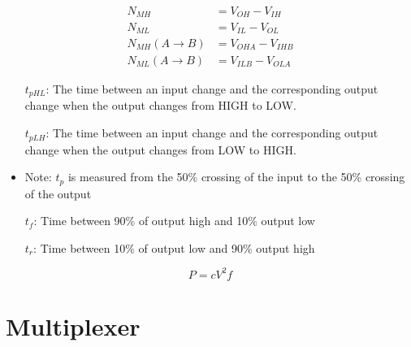 \documentclass[8pt]{article}
\begin{document}
\begin{align*}
    N_{MH}                  & = V_{OH} - V_{IH}   \\
    N_{ML}                  & = V_{IL} - V_{OL}   \\
    N_{MH}(A \rightarrow B) & = V_{OHA} - V_{IHB} \\
    N_{ML}(A \rightarrow B) & = V_{ILB} - V_{OLA}
\end{align*}

\begin{itemize}
    \item[$t_{pHL}$:] The time between an input change and the corresponding output change
          when the output changes from HIGH to LOW.
    \item[$t_{pLH}$:] The time between an input change and the corresponding output change
          when the output changes from LOW to HIGH.
    \item Note: $t_p$ is measured from the 50\% crossing
          of the input to the 50\% crossing of the output
    \item[$t_f$:] Time between 90\% of output high and 10\% output low
    \item[$t_r$:] Time between 10\% of output low and 90\% output high
\end{itemize}

\[  P = cV^2 f \]

\section*{Multiplexer}
\end{document}
